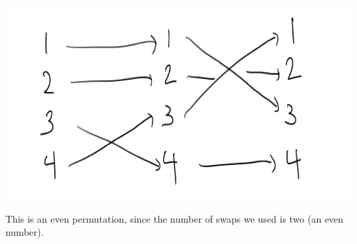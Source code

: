 {\begin{center}
\includegraphics[alt={The permutation that swaps 3 and 4, followed by the permutation that swaps 1 and 3.},scale=.35]{permutation_2.jpg}
\end{center}
This is an even permutation, since the number of swaps we used is two (an even number).
} %


